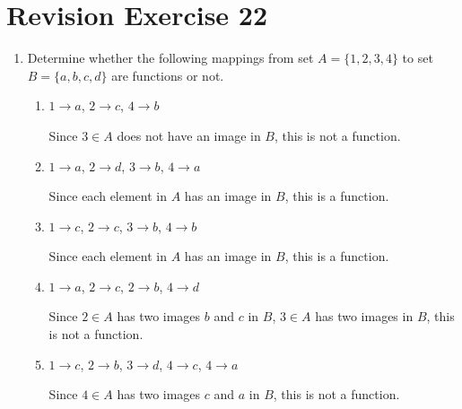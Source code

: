 \documentclass[12pt]{report}
\begin{document}
\newpage

\section{Revision Exercise 22}

\begin{enumerate}
      \item Determine whether the following mappings from set $A = \{1, 2, 3, 4\}$ to set
            $B = \{a, b, c, d\}$ are functions or not.
            \begin{enumerate}
                  \item $1 \to a$, $2 \to c$, $4 \to b$
                        \sol{}

                        Since $3 \in A$ does not have an image in $B$, this is not a function.

                  \item $1 \to a$, $2 \to d$, $3 \to b$, $4 \to a$
                        \sol{}

                        Since each element in $A$ has an image in $B$, this is a function.

                  \item $1 \to c$, $2 \to c$, $3 \to b$, $4 \to b$
                        \sol{}

                        Since each element in $A$ has an image in $B$, this is a function.

                  \item $1 \to a$, $2 \to c$, $2 \to b$, $4 \to d$
                        \sol{}

                        Since $2 \in A$ has two images $b$ and $c$ in $B$, $3 \in A$ has two images in
                        $B$, this is not a function.

                  \item $1 \to c$, $2 \to b$, $3 \to d$, $4 \to c$, $4 \to a$
                        \sol{}

                        Since $4 \in A$ has two images $c$ and $a$ in $B$, this is not a function.
            \end{enumerate}


\end{enumerate}
\end{document}
